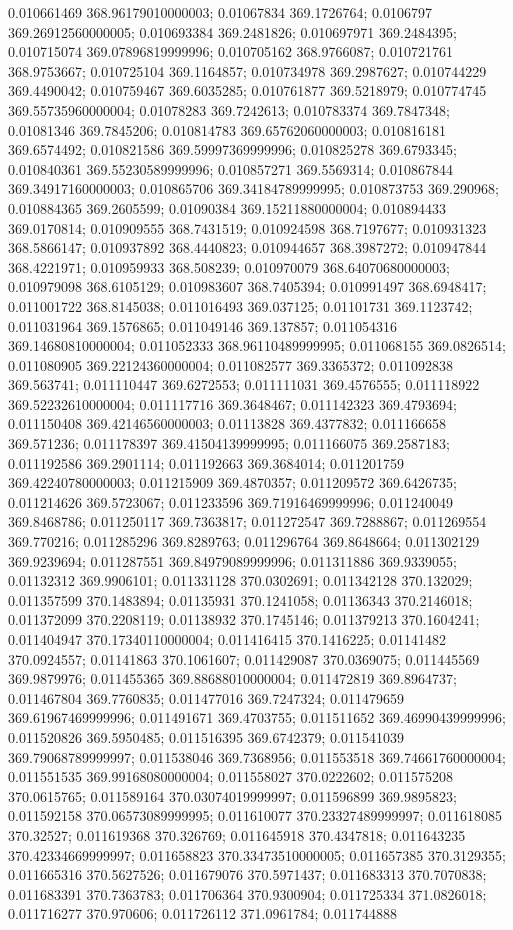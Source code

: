 0.010661469 368.96179010000003; 0.01067834 369.1726764; 0.0106797 369.26912560000005; 0.010693384 369.2481826; 0.010697971 369.2484395; 0.010715074 369.07896819999996; 0.010705162 368.9766087; 0.010721761 368.9753667; 0.010725104 369.1164857; 0.010734978 369.2987627; 0.010744229 369.4490042; 0.010759467 369.6035285; 0.010761877 369.5218979; 0.010774745 369.55735960000004; 0.01078283 369.7242613; 0.010783374 369.7847348; 0.01081346 369.7845206; 0.010814783 369.65762060000003; 0.010816181 369.6574492; 0.010821586 369.59997369999996; 0.010825278 369.6793345; 0.010840361 369.55230589999996; 0.010857271 369.5569314; 0.010867844 369.34917160000003; 0.010865706 369.34184789999995; 0.010873753 369.290968; 0.010884365 369.2605599; 0.01090384 369.15211880000004; 0.010894433 369.0170814; 0.010909555 368.7431519; 0.010924598 368.7197677; 0.010931323 368.5866147; 0.010937892 368.4440823; 0.010944657 368.3987272; 0.010947844 368.4221971; 0.010959933 368.508239; 0.010970079 368.64070680000003; 0.010979098 368.6105129; 0.010983607 368.7405394; 0.010991497 368.6948417; 0.011001722 368.8145038; 0.011016493 369.037125; 0.01101731 369.1123742; 0.011031964 369.1576865; 0.011049146 369.137857; 0.011054316 369.14680810000004; 0.011052333 368.96110489999995; 0.011068155 369.0826514; 0.011080905 369.22124360000004; 0.011082577 369.3365372; 0.011092838 369.563741; 0.011110447 369.6272553; 0.011111031 369.4576555; 0.011118922 369.52232610000004; 0.011117716 369.3648467; 0.011142323 369.4793694; 0.011150408 369.42146560000003; 0.01113828 369.4377832; 0.011166658 369.571236; 0.011178397 369.41504139999995; 0.011166075 369.2587183; 0.011192586 369.2901114; 0.011192663 369.3684014; 0.011201759 369.42240780000003; 0.011215909 369.4870357; 0.011209572 369.6426735; 0.011214626 369.5723067; 0.011233596 369.71916469999996; 0.011240049 369.8468786; 0.011250117 369.7363817; 0.011272547 369.7288867; 0.011269554 369.770216; 0.011285296 369.8289763; 0.011296764 369.8648664; 0.011302129 369.9239694; 0.011287551 369.84979089999996; 0.011311886 369.9339055; 0.01132312 369.9906101; 0.011331128 370.0302691; 0.011342128 370.132029; 0.011357599 370.1483894; 0.01135931 370.1241058; 0.01136343 370.2146018; 0.011372099 370.2208119; 0.01138932 370.1745146; 0.011379213 370.1604241; 0.011404947 370.17340110000004; 0.011416415 370.1416225; 0.01141482 370.0924557; 0.01141863 370.1061607; 0.011429087 370.0369075; 0.011445569 369.9879976; 0.011455365 369.88688010000004; 0.011472819 369.8964737; 0.011467804 369.7760835; 0.011477016 369.7247324; 0.011479659 369.61967469999996; 0.011491671 369.4703755; 0.011511652 369.46990439999996; 0.011520826 369.5950485; 0.011516395 369.6742379; 0.011541039 369.79068789999997; 0.011538046 369.7368956; 0.011553518 369.74661760000004; 0.011551535 369.99168080000004; 0.011558027 370.0222602; 0.011575208 370.0615765; 0.011589164 370.03074019999997; 0.011596899 369.9895823; 0.011592158 370.06573089999995; 0.011610077 370.23327489999997; 0.011618085 370.32527; 0.011619368 370.326769; 0.011645918 370.4347818; 0.011643235 370.42334669999997; 0.011658823 370.33473510000005; 0.011657385 370.3129355; 0.011665316 370.5627526; 0.011679076 370.5971437; 0.011683313 370.7070838; 0.011683391 370.7363783; 0.011706364 370.9300904; 0.011725334 371.0826018; 0.011716277 370.970606; 0.011726112 371.0961784; 0.011744888 